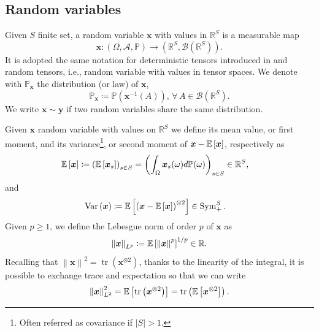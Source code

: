 \documentclass[a4paper, 11pt, reqno]{amsart}
\theoremstyle{plain}
\theoremstyle{remark}
\theoremstyle{definition}
\newcommand{\prob}[1]{\mathbb{P}\left(#1\right)}
\newcommand{\mean}[2][\kern-0.5pt]{\mathbb{E}_{#1}\left[#2\right]}
\newcommand{\var}[1]{\operatorname{Var}\left(#1\right)}
\newcommand{\real}{\mathbb{R}}
\newcommand{\borel}[1]{\mathcal{B}\left(#1\right)}
\newcommand{\norm}[1]{\left\lVert#1\right\rVert}
\newcommand{\trace}[1]{\operatorname{tr}\left(#1\right)}
\let\oldforall\forall
\renewcommand{\forall}{\oldforall\,}
\begin{document}
\subsection{Random variables} \label{subsec:rv}

Given $S$ finite set, a random variable $\bm{x}$ with values in $\real^S$ is a measurable map
\begin{equation*}
	\bm{x}: (\Omega, \mathcal{A}, \mathbb{P}) \to (\real^S, \borel{\real^S}).
\end{equation*}
It is adopted the same notation for deterministic tensors introduced in  and random tensors, i.e., random variable with values in tensor spaces. 
We denote with $\mathbb{P}_{\bm{x}}$ the distribution (or law) of $\bm{x}$, 
\begin{equation*}
	\mathbb{P}_{\bm{x}} \coloneqq \prob{\bm{x}^{-1}(A)}, \, \forall A \in \borel{\real^S}.
\end{equation*}
We write $\bm{x} \sim \bm{y}$ if two random variables share the same distribution.

\smallskip

Given $\bm{x}$ random variable with values on $\real^S$ we define its mean value, or first moment, and its variance\footnote{Often referred as covariance if $|S| > 1$.}, or second moment of $\bm{x} - \mean{\bm{x}}$, respectively as
\begin{equation*}
	\begin{aligned}
		\mean{\bm{x}} & \coloneqq \left(\mean{\bm{x}_s}\right)_{s \in S} = \left(\int_{\Omega} \bm{x}_s(\omega) d\mathbb{P}(\omega)\right)_{s \in S} \in \real^S,
	\end{aligned}
\end{equation*}
and
\begin{equation*}
	\begin{aligned}
		\var{\bm{x}} & \coloneqq \mean{\left(\bm{x} - \mean{\bm{x}}\right)^{\otimes 2}} \in \operatorname{Sym}_+^{S}.
	\end{aligned}
\end{equation*}
Given $p \geq 1$, we define the Lebesgue norm of order $p$ of $\bm{x}$ as
\begin{equation*}
	\norm{\bm{x}}_{L^p} \coloneqq \mean{\norm{\bm{x}}^p}^{1/p} \in \real.
\end{equation*}
Recalling that $\norm{\bm{x}}^2 = \trace{\bm{x}^{\otimes 2}}$, thanks to the linearity of the integral, it is possible to exchange trace and expectation so that we can write 
\begin{equation*}
	\norm{\bm{x}}_{L^2}^2 = \mean{\trace{\bm{x}^{\otimes 2}}} = \trace{\mean{\bm{x}^{\otimes 2}}}.
\end{equation*}
\end{document}
